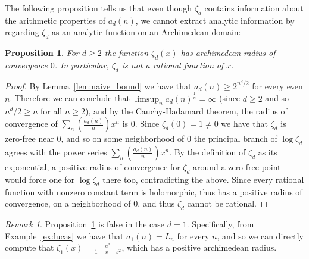 \documentclass{article}
\theoremstyle{plain}
\newtheorem{proposition}[theorem]{Proposition}
\theoremstyle{definition}
\theoremstyle{remark}
\newtheorem{remark}[theorem]{Remark}
\newcommand{\Z}{\mathbb{Z}}
\begin{document}

The following proposition tells us that even though $\zeta_d$ contains information about the arithmetic properties of $a_d(n)$, we cannot extract analytic information by regarding $\zeta_d$ as an analytic  function on an Archimedean domain:

\begin{proposition}\label{thm:zeta}
For $d\ge2$ the function $\zeta_d(x)$ has archimedean radius of convergence $0$. In particular, $\zeta_d$ is not a rational function of $x$.
\end{proposition}
\begin{proof}
By Lemma~\ref{lem:naive_bound} we have that $a_d(n)\ge2^{n^d/2}$ for every even $n$. Therefore we can conclude that $\limsup_na_d(n)^{\frac{1}{n}}=\infty$ (since $d\ge2$ and so $n^d/2\ge n$ for all $n\ge2$), and by the Cauchy-Hadamard theorem, the radius of convergence of $\sum_n\left(\frac{a_d(n)}{n}\right)x^n$ is $0$. Since $\zeta_d(0)=1\ne0$ we have that $\zeta_d$ is zero-free near $0$, and so on some neighborhood of $0$ the principal branch of $\log\zeta_d$ agrees with the power series $\sum_n\left(\frac{a_d(n)}{n}\right)x^n$. By the definition of $\zeta_d$ as its exponential, a positive radius of convergence for $\zeta_d$ around a zero-free point would force one for $\log\zeta_d$ there too, contradicting the above. Since every rational function with nonzero constant term is holomorphic, thus has a positive radius of convergence, on a neighborhood of $0$, and thus $\zeta_d$ cannot be rational.
\end{proof}

\begin{remark}
    Proposition~\ref{thm:zeta} is false in the case $d=1$. Specifically, from Example~\ref{ex:lucas} we have that $a_1(n)=L_n$ for every $n$, and so we can directly compute that $\zeta_1(x)=\frac{e^x}{1-x-x^2}$, which has a positive archimedean radius. 
\end{remark}
\end{document}
